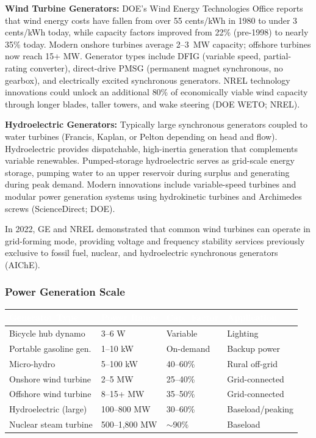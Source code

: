 \documentclass[11pt,letterpaper]{article}
\newcommand{\tableheader}[1]{\textbf{\sffamily\textcolor{white}{#1}}}
\begin{document}
\textbf{Wind Turbine Generators:} DOE's Wind Energy Technologies Office reports that wind energy costs have fallen from over 55 cents/kWh in 1980 to under 3 cents/kWh today, while capacity factors improved from 22\% (pre-1998) to nearly 35\% today. Modern onshore turbines average 2--3~MW capacity; offshore turbines now reach 15+ MW. Generator types include DFIG (variable speed, partial-rating converter), direct-drive PMSG (permanent magnet synchronous, no gearbox), and electrically excited synchronous generators. NREL technology innovations could unlock an additional 80\% of economically viable wind capacity through longer blades, taller towers, and wake steering (DOE WETO; NREL).

\textbf{Hydroelectric Generators:} Typically large synchronous generators coupled to water turbines (Francis, Kaplan, or Pelton depending on head and flow). Hydroelectric provides dispatchable, high-inertia generation that complements variable renewables. Pumped-storage hydroelectric serves as grid-scale energy storage, pumping water to an upper reservoir during surplus and generating during peak demand. Modern innovations include variable-speed turbines and modular power generation systems using hydrokinetic turbines and Archimedes screws (ScienceDirect; DOE).

In 2022, GE and NREL demonstrated that common wind turbines can operate in grid-forming mode, providing voltage and frequency stability services previously exclusive to fossil fuel, nuclear, and hydroelectric synchronous generators (AIChE).

\subsubsection{Power Generation Scale}

\begin{center}
\begin{tabularx}{\textwidth}{L{3.5cm}C{2.5cm}C{2.5cm}X}
\toprule
{}
\tableheader{Generator Type} & \tableheader{Power Range} & \tableheader{Cap.\ Factor} & \tableheader{Application} \\
\midrule
Bicycle hub dynamo & 3--6 W & Variable & Lighting \\
Portable gasoline gen. & 1--10 kW & On-demand & Backup power \\
Micro-hydro & 5--100 kW & 40--60\% & Rural off-grid \\
Onshore wind turbine & 2--5 MW & 25--40\% & Grid-connected \\
Offshore wind turbine & 8--15+ MW & 35--50\% & Grid-connected \\
Hydroelectric (large) & 100--800 MW & 30--60\% & Baseload/peaking \\
Nuclear steam turbine & 500--1,800 MW & $\sim$90\% & Baseload \\
\bottomrule
\end{tabularx}
\end{center}
\end{document}

